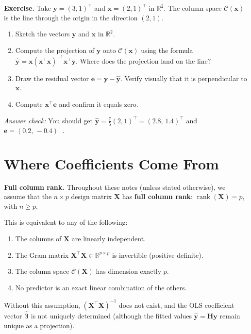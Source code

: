 \documentclass[11pt,a4paper]{article}
\theoremstyle{plain}
\theoremstyle{definition}
\newcommand{\R}{\mathbb{R}}
\newcommand{\yhat}{\hat{\bm{y}}}
\newcommand{\bhat}{\hat{\bm{\beta}}}
\newcommand{\bX}{\bm{X}}
\newcommand{\by}{\bm{y}}
\newcommand{\be}{\bm{e}}
\newcommand{\bH}{\bm{H}}
\newcommand{\Col}{\mathcal{C}}
\DeclareMathOperator{\rank}{rank}
\begin{document}
\begin{stopandthink}
\textbf{Exercise.}
Take $\by = (3, 1)^\top$ and $\bm{x} = (2, 1)^\top$ in $\R^2$.
The column space $\Col(\bm{x})$ is the line through the origin in the
direction $(2,1)$.
\begin{enumerate}[nosep]
  \item Sketch the vectors $\by$ and $\bm{x}$ in $\R^2$.
  \item Compute the projection of $\by$ onto $\Col(\bm{x})$ using the
        formula $\yhat = \bm{x}(\bm{x}^\top\bm{x})^{-1}\bm{x}^\top\by$.
        Where does the projection land on the line?
  \item Draw the residual vector $\be = \by - \yhat$.
        Verify visually that it is perpendicular to $\bm{x}$.
  \item Compute $\bm{x}^\top \be$ and confirm it equals zero.
\end{enumerate}
\emph{Answer check:} You should get $\yhat = \tfrac{7}{5}(2, 1)^\top
= (2.8,\, 1.4)^\top$ and $\be = (0.2,\, -0.4)^\top$.
\end{stopandthink}


\section{Where Coefficients Come From}\label{sec:coefficients}

\begin{tcolorbox}[
  colback=colspace!8, colframe=colspace!80!black,
  fonttitle=\bfseries, title=Standing Assumption,
  arc=2mm, boxrule=0.8pt
]
\textbf{Full column rank.}
Throughout these notes (unless stated otherwise), we assume that the
$n\times p$ design matrix $\bX$ has \textbf{full column rank}:
$\rank(\bX) = p$, with $n \ge p$.

This is equivalent to any of the following:
\begin{enumerate}[nosep,label=(\roman*)]
  \item The columns of $\bX$ are linearly independent.
  \item The Gram matrix $\bX^\top\bX\in\R^{p\times p}$ is invertible
        (positive definite).
  \item The column space $\Col(\bX)$ has dimension exactly $p$.
  \item No predictor is an exact linear combination of the others.
\end{enumerate}
Without this assumption, $(\bX^\top\bX)^{-1}$ does not exist, and the OLS
coefficient vector $\bhat$ is not uniquely determined (although the
fitted values $\yhat = \bH\by$ remain unique as a projection).
\end{tcolorbox}
\end{document}
